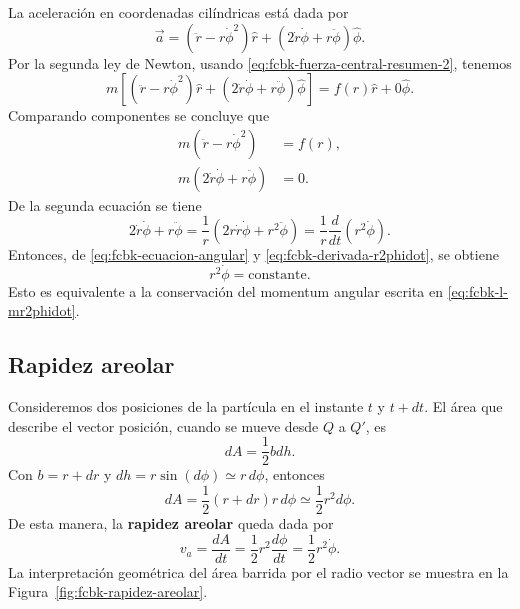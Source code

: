 \documentclass[../apunte_mecanica_clasica.tex]{subfiles}%
\begin{document}
La aceleración en coordenadas cilíndricas está dada por
\begin{equation}
    \vec a=(\ddot r-r\dot\phi^2)\hat r+(2\dot r\dot\phi+r\ddot\phi)\hat\phi.
    \label{eq:fcbk-aceleracion-cilindrica}
\end{equation}
Por la segunda ley de Newton, usando \eqref{eq:fcbk-fuerza-central-resumen-2}, tenemos
\begin{equation}
    m\left[(\ddot r-r\dot\phi^2)\hat r+(2\dot r\dot\phi+r\ddot\phi)\hat\phi\right]
    =f(r)\hat r+0\hat\phi.
    \label{eq:fcbk-newton-cilindricas}
\end{equation}
Comparando componentes se concluye que
\begin{align}
    m(\ddot r-r\dot\phi^2)&=f(r),
    \label{eq:fcbk-ecuacion-radial}\\
    m(2\dot r\dot\phi+r\ddot\phi)&=0.
    \label{eq:fcbk-ecuacion-angular}
\end{align}
De la segunda ecuación se tiene
\begin{equation}
    2\dot r\dot\phi+r\ddot\phi
    =\frac{1}{r}\left(2r\dot r\dot\phi+r^2\ddot\phi\right)
    =\frac{1}{r}\frac{d}{dt}\left(r^2\dot\phi\right).
    \label{eq:fcbk-derivada-r2phidot}
\end{equation}
Entonces, de \eqref{eq:fcbk-ecuacion-angular} y \eqref{eq:fcbk-derivada-r2phidot}, se obtiene
\begin{equation}
    r^2\dot\phi=\text{constante}.
    \label{eq:fcbk-r2phidot-constante}
\end{equation}
Esto es equivalente a la conservación del momentum angular escrita en \eqref{eq:fcbk-l-mr2phidot}.

\subsection{Rapidez areolar}

Consideremos dos posiciones de la partícula en el instante $t$ y $t+dt$. El área que describe el vector posición, cuando se mueve desde $Q$ a $Q'$, es
\begin{equation}
    dA=\frac{1}{2}bdh.
    \label{eq:fcbk-area-diferencial-triangulo}
\end{equation}
Con $b=r+dr$ y $dh=r\sin(d\phi)\simeq r\,d\phi$, entonces
\begin{equation}
    dA=\frac{1}{2}(r+dr)r\,d\phi\simeq \frac{1}{2}r^2d\phi.
    \label{eq:fcbk-dA-areolar}
\end{equation}
De esta manera, la \textbf{rapidez areolar} queda dada por
\begin{equation}
    v_a=\frac{dA}{dt}=\frac{1}{2}r^2\frac{d\phi}{dt}=\frac{1}{2}r^2\dot\phi.
    \label{eq:fcbk-rapidez-areolar}
\end{equation}
La interpretación geométrica del área barrida por el radio vector se muestra en la Figura~\ref{fig:fcbk-rapidez-areolar}.
\end{document}
